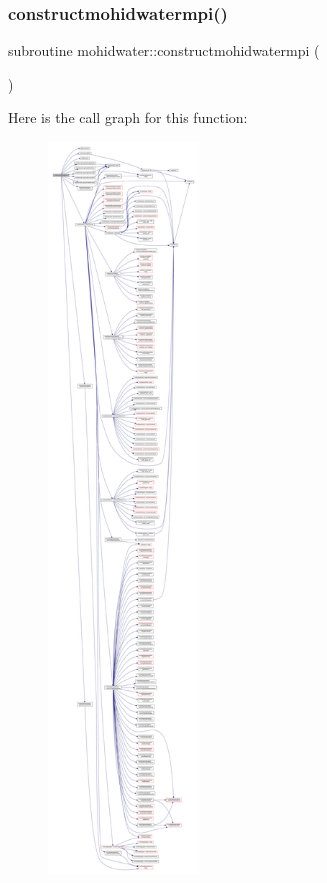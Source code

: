 \subsubsection{\texorpdfstring{constructmohidwatermpi()}{constructmohidwatermpi()}}
{\footnotesize\ttfamily subroutine mohidwater\+::constructmohidwatermpi (\begin{DoxyParamCaption}{ }\end{DoxyParamCaption})}

Here is the call graph for this function\+:\nopagebreak
\begin{figure}[H]
\begin{center}
\leavevmode
\includegraphics[height=550pt]{_main_8_f90_a364d1a7b4621ef3a56c71daf2af5147e_cgraph}
\end{center}
\end{figure}
\mbox{\label{_main_8_f90_a5a877f32d8c35a58c7bd824a65b07dba}} 
